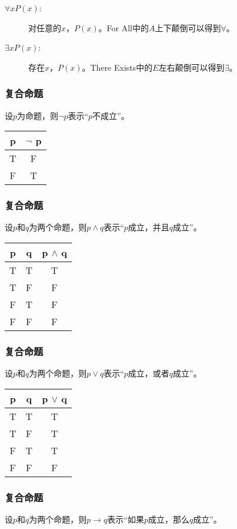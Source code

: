 \documentclass{beamer}
\begin{document}
\begin{CJK*}{UTF8}{gbsn}
\begin{frame}
\begin{description}
\item [$\forall x P(x)$:] 对任意的$x$，$P(x)$。For All中的$A$上下颠倒可以得到$\forall$。
\item [$\exists x P(x)$:] 存在$x$，$P(x)$。There Exists中的$E$左右颠倒可以得到$\exists$。
\end{description}

\end{frame}
\begin{frame}
  \frametitle{复合命题}
  设$p$为命题，则$\lnot p$表示“$p$不成立”。

 \begin{tabular}{c|c}
    p& $\lnot$ p\\
    \hline
    T&F\\
    F&T\\
  \end{tabular}

\end{frame}
\begin{frame}
    \frametitle{复合命题}
    设$p$和$q$为两个命题，则$p\land q$表示“$p$成立，并且$q$成立”。
  
  \begin{tabular}{cc|c}
    p& q& p $\land$ q\\
    \hline
    T&T&T\\
    T&F&F\\
    F&T&F\\
    F&F&F\\
  \end{tabular}

\end{frame}
\begin{frame}
    \frametitle{复合命题}

    设$p$和$q$为两个命题，则$p\lor q$表示“$p$成立，或者$q$成立”。
  
  \begin{tabular}{cc|c}
    p& q& p $\lor$ q\\
    \hline
    T&T&T\\
    T&F&T\\
    F&T&T\\
    F&F&F\\
  \end{tabular}

\end{frame}
\begin{frame}
    \frametitle{复合命题}
  设$p$和$q$为两个命题，则$p\to q$表示“如果$p$成立，那么$q$成立”。  


\end{frame}
\end{CJK*}
\end{document}

